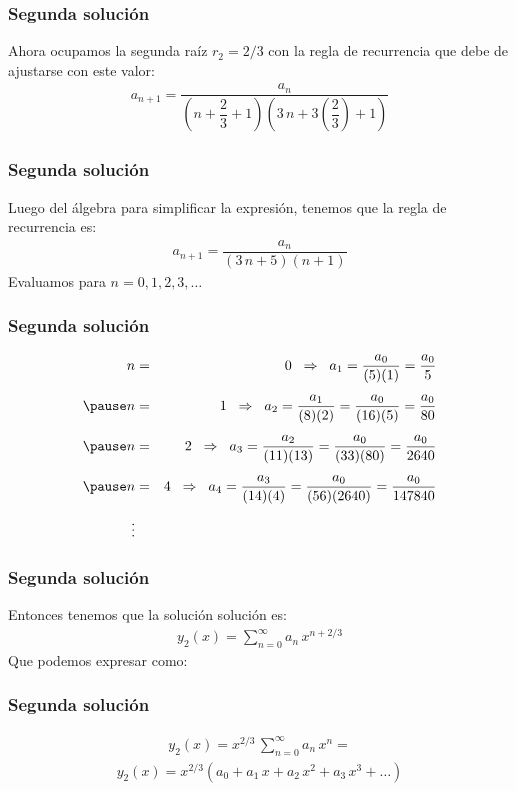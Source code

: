 \begin{frame}
\frametitle{Segunda solución}
Ahora ocupamos la segunda raíz $r_{2} = 2/3$ con la regla de recurrencia que debe de ajustarse con este valor:
\begin{align*}
a_{n+1} = \dfrac{a_{n}}{\left( n + \dfrac{2}{3} + 1  \right)\left( 3 \, n + 3 \left( \dfrac{2}{3} \right) + 1 \right)}
\end{align*}
\end{frame}
\begin{frame}
\frametitle{Segunda solución}
Luego del álgebra para simplificar la expresión, tenemos que la regla de recurrencia es:
\begin{align*}
a_{n+1} = \dfrac{a_{n}}{(3 \, n + 5)(n + 1)}
\end{align*}
Evaluamos para $n = 0, 1, 2, 3, \ldots$
\end{frame}
\begin{frame}
\frametitle{Segunda solución}
\begin{eqnarray*}
n &=& 0 \hspace{0.2cm} \Rightarrow \hspace{0.2cm} a_{1} = \dfrac{a_{0}}{(5)(1)} = \dfrac{a_{0}}{5} \\[0.45em] \pause
n &=& 1 \hspace{0.2cm} \Rightarrow \hspace{0.2cm} a_{2} = \dfrac{a_{1}}{(8)(2)} = \dfrac{a_{0}}{(16)(5)} = \dfrac{a_{0}}{80} \\[0.45em] \pause
n &=& 2 \hspace{0.2cm} \Rightarrow \hspace{0.2cm} a_{3} = \dfrac{a_{2}}{(11)(13)} = \dfrac{a_{0}}{(33)(80)} = \dfrac{a_{0}}{2640} \\[0.45em] \pause
n &=& 4 \hspace{0.2cm} \Rightarrow \hspace{0.2cm} a_{4} = \dfrac{a_{3}}{(14)(4)} = \dfrac{a_{0}}{(56)(2640)} = \dfrac{a_{0}}{147840} \\[0.45em]
\vdots
\end{eqnarray*}
\end{frame}
\begin{frame}
\frametitle{Segunda solución}
Entonces tenemos que la solución solución es:
\begin{align*}
y_{2}(x) = \sum_{n=0}^{\infty} a_{n} \, x^{n + 2/3}
\end{align*}
Que podemos expresar como:
\end{frame}
\begin{frame}
\frametitle{Segunda solución}
\begin{align*}
y_{2}(x) = x^{2/3} \, \sum_{n=0}^{\infty} a_{n} \, x^{n} = 
\end{align*}
\pause
\begin{align*}
y_{2} (x) =  x^{2/3} \left( a_{0} + a_{1} \, x + a_{2} \, x^{2} + a_{3} \, x^{3} + \ldots \right)
\end{align*}
\end{frame}
